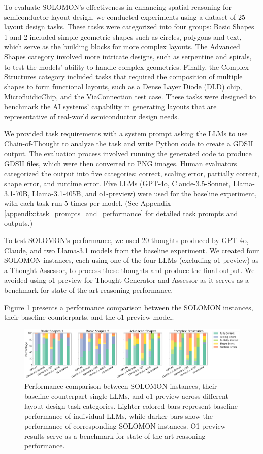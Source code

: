 \documentclass{article}
\begin{document}
To evaluate SOLOMON's effectiveness in enhancing spatial reasoning for semiconductor layout design, we conducted experiments using a dataset of 25 layout design tasks. These tasks were categorized into four groups: Basic Shapes 1 and 2 included simple geometric shapes such as circles, polygons and text, which serve as the building blocks for more complex layouts. The Advanced Shapes category involved more intricate designs, such as serpentine and spirals, to test the models' ability to handle complex geometries. Finally, the Complex Structures category included tasks that required the composition of multiple shapes to form functional layouts, such as a Dense Layer Diode (DLD) chip, MicrofluidicChip, and the ViaConnection test case. These tasks were designed to benchmark the AI systems' capability in generating layouts that are representative of real-world semiconductor design needs.

We provided task requirements with a system prompt asking the LLMs to use Chain-of-Thought to analyze the task and write Python code to create a GDSII output. The evaluation process involved running the generated code to produce GDSII files, which were then converted to PNG images. Human evaluators categorized the output into five categories: correct, scaling error, partially correct, shape error, and runtime error. Five LLMs (GPT-4o, Claude-3.5-Sonnet, Llama-3.1-70B, Llama-3.1-405B, and o1-preview) were used for the baseline experiment, with each task run 5 times per model. (See Appendix \ref{appendix:task_prompts_and_performance} for detailed task prompts and outputs.)

To test SOLOMON's performance, we used 20 thoughts produced by GPT-4o, Claude, and two Llama-3.1 models from the baseline experiment. We created four SOLOMON instances, each using one of the four LLMs (excluding o1-preview) as a Thought Assessor, to process these thoughts and produce the final output. We avoided using o1-preview for Thought Generator and Assessor as it serves as a benchmark for state-of-the-art reasoning performance.

Figure \ref{fig:performance_comparison} presents a performance comparison between the SOLOMON instances, their baseline counterparts, and the o1-preview model.

\begin{figure}[h]
  \centering
  \includegraphics[width=\textwidth]{output.png}
  \caption{Performance comparison between SOLOMON instances, their baseline counterpart single LLMs, and o1-preview across different layout design task categories. Lighter colored bars represent baseline performance of individual LLMs, while darker bars show the performance of corresponding SOLOMON instances. O1-preview results serve as a benchmark for state-of-the-art reasoning performance.}
  \label{fig:performance_comparison}
\end{figure}
\end{document}
